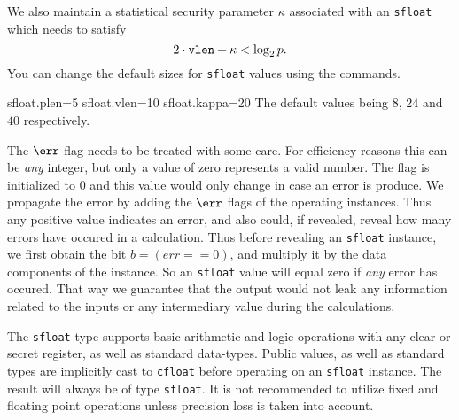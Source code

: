 We also maintain a statistical security parameter $\kappa$ 
associated with an \verb+sfloat+ which needs
to satisfy
\[ 2 \cdot \verb+vlen+  + \kappa < \log_2 p. \]
You can change the default sizes for \verb|sfloat| values using the commands.
\begin{mylisting}
    sfloat.plen=5 
    sfloat.vlen=10
    sfloat.kappa=20
The default values being $8$, $24$ and $40$ respectively.

The $\err$ flag needs to be treated with some care.
For efficiency reasons this can be {\em any} integer, but only
a value of zero represents a valid number.
The flag is initialized to $0$ and this value would only change in case an error is produce. 
We propagate the error by adding the $\err$ flags of the operating instances.
Thus any positive value indicates an error, and also could, if revealed, reveal how
many errors have occured in a calculation.
Thus before revealing an \verb|sfloat| instance, we first obtain the bit $ b = (err == 0)$, 
and multiply it by the data components of the instance. So an \verb|sfloat| value
will equal zero if {\em any} error has occured.
That way we guarantee that the output would not leak any information 
related to the inputs or any intermediary value during the calculations. 

The \verb|sfloat| type supports basic arithmetic and logic operations with 
any clear or secret register, as well as standard data-types. 
Public values, as well as standard types are implicitly cast to \verb|cfloat| 
before operating on an \verb|sfloat| instance. The result will always be of type \verb|sfloat|. 
It is not recommended to utilize fixed and floating point operations unless
precision loss is taken into account.
 

\end{mylisting}
